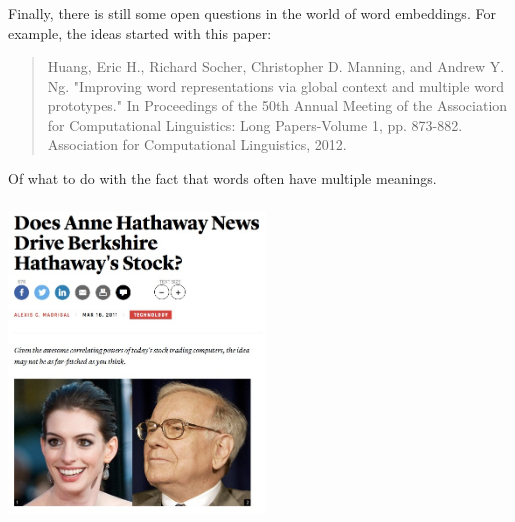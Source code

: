 \documentclass[xetex,mathserif,serif,aspectratio=169]{beamer}
\begin{document}
\begin{frame}[fragile] \frametitle{} \oldB \small

Finally, there is still some open questions in the world of
word embeddings. For example, the ideas started with this
paper:
\begin{quote}
Huang, Eric H., Richard Socher, Christopher D. Manning, and
Andrew Y. Ng. "Improving word representations via global
context and multiple word prototypes." In Proceedings of the
50th Annual Meeting of the Association for
Computational Linguistics: Long Papers-Volume 1, pp. 873-882.
Association for Computational Linguistics, 2012.
\end{quote}
Of what to do with the fact that words often have multiple
meanings.

\end{frame}

\begin{frame}[fragile] \frametitle{} \oldB \small

\begin{center}
\includegraphics[height=8cm]{img/hathaway.jpg}
\end{center}

\end{frame}
\end{document}
